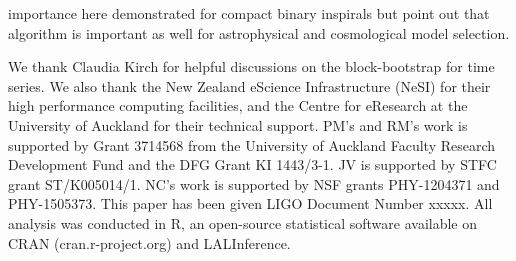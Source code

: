 \documentclass[aps,reprint,amsmath,amssymb,showpacs,showkeys]{revtex4-1}%
\newcommand{\cb}{ \color{blue}}
\begin{document}
{\cb importance here demonstrated for compact binary inspirals but point out that algorithm is important as well for astrophysical and cosmological model selection}. 

\begin{acknowledgements}
  We thank Claudia Kirch for helpful discussions on the block-bootstrap for time series.  We also thank the New Zealand eScience Infrastructure (NeSI) for their high performance computing facilities, and the Centre for eResearch at the University of Auckland for their technical support. PM's and RM's work is supported by Grant 3714568 from the University of Auckland Faculty Research Development Fund and the DFG Grant KI 1443/3-1. JV is supported by STFC grant ST/K005014/1. NC's work is supported by NSF grants PHY-1204371 and PHY-1505373. This paper has been given LIGO Document Number xxxxx.  All analysis was conducted in \textsf{R}, an open-source statistical software available on \textsf{CRAN} (cran.r-project.org) and LALInference.
\end{acknowledgements}
\pagebreak






\end{document}
